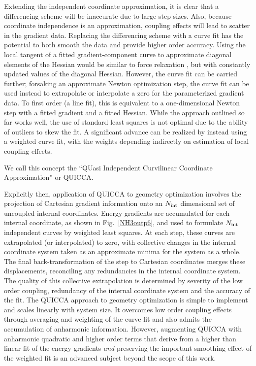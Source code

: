 \documentclass[prl,twocolumn,showpacs,twocolumngrid,superbib]{revtex4}
\begin{document}
Extending the independent coordinate approximation, it is clear that a differencing scheme will be inaccurate 
due to large step sizes.  Also, because coordinate independence is an approximation, coupling effects will lead
to scatter in the gradient data.  Replacing  the differencing scheme with a curve fit has the potential to both 
smooth the data and provide higher order accuracy.  
Using the local tangent of a fitted gradient-component curve 
to approximate 
diagonal elements of the Hessian 
would be similar to force relaxation \cite{PPulay77,HSellers78,CVanAlsenoy98}, but with constantly updated 
values of the diagonal Hessian.  However, the curve fit can be carried further;  forsaking an approximate Newton optimization step, 
the curve fit can be used instead to extrapolate or interpolate a zero for the parameterized gradient data.  
To first order (a line fit), this is equivalent to a one-dimensional Newton step with a fitted gradient and a 
fitted Hessian.   While the approach outlined so far works well, the use of standard least squares is not 
optimal due to the ability of outliers to skew the fit.  A significant advance can be realized by instead using 
a weighted curve fit, with the weights depending indirectly on estimation of local coupling effects. 

We call this concept the ``QUasi Independent Curvilinear Coordinate Approximation'' or QUICCA. 

Explicitly then, application of QUICCA to geometry optimization involves the  projection of Cartesian 
gradient information onto 
an $N_{\rm int}$ dimensional set of uncoupled internal coordinates.  
Energy gradients 
are accumulated for each internal coordinate, as shown in Fig.~\ref{NH3outp6}, and used to formulate 
$N_{\rm int}$ independent curves by weighted least squares.  At each step, these curves are extrapolated 
(or interpolated) to zero, with collective changes in the internal coordinate system taken as an approximate 
minima for the system as a whole. The final back-transformation of the step to Cartesian coordinates merges 
these displacements, reconciling any redundancies in the internal coordinate system. The quality of this 
collective extrapolation is determined by severity of the low order coupling, redundancy of the internal 
coordinate system and the accuracy of the fit.  The QUICCA approach to geometry optimization is simple to 
implement and scales linearly with system size.  It overcomes low order coupling effects through averaging and 
weighting of the curve fit and also admits the accumulation of anharmonic information.  
However,  augmenting QUICCA with anharmonic quadratic and higher order 
terms that derive from a higher than linear fit of the 
energy gradients {\em and} preserving the important smoothing 
effect of the weighted fit is an advanced subject beyond the 
scope of this work.
\end{document}
